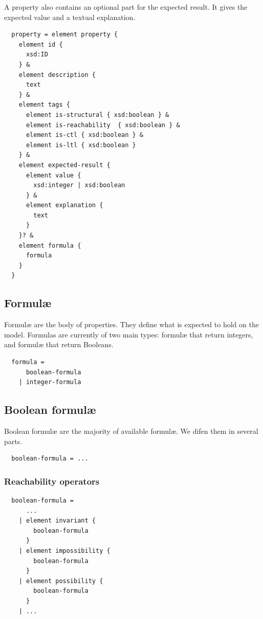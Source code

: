 \documentclass[10pt,english,a4paper]{article}
\begin{document}
A property also contains an optional part for the expected result.
It gives the expected value and a textual explanation.
\begin{lstlisting}
  property = element property {
    element id {
      xsd:ID
    } &
    element description {
      text
    } &
    element tags {
      element is-structural { xsd:boolean } &
      element is-reachability  { xsd:boolean } &
      element is-ctl { xsd:boolean } &
      element is-ltl { xsd:boolean }
    } &
    element expected-result {
      element value {
        xsd:integer | xsd:boolean
      } &
      element explanation {
        text
      }
    }? &
    element formula {
      formula
    }
  }
\end{lstlisting}

\subsection{Formul{\ae}}
Formul{\ae} are the body of properties.
They define what is expected to hold on the model.
Formulas are currently of two main types: formul{\ae} that return integers, and formul{\ae}
that return Booleans.

\begin{lstlisting}
  formula =
      boolean-formula
    | integer-formula
\end{lstlisting}

\clearpage
\subsection{Boolean formul{\ae}}

Boolean formul{\ae} are the majority of available formul{\ae}.
We difen them in several parts.

\begin{lstlisting}
  boolean-formula = ...
\end{lstlisting}

\subsubsection{Reachability operators}

\begin{lstlisting}
  boolean-formula =
      ...
    | element invariant {
        boolean-formula
      }
    | element impossibility {
        boolean-formula
      }
    | element possibility {
        boolean-formula
      }
    | ...
\end{lstlisting}
\end{document}
